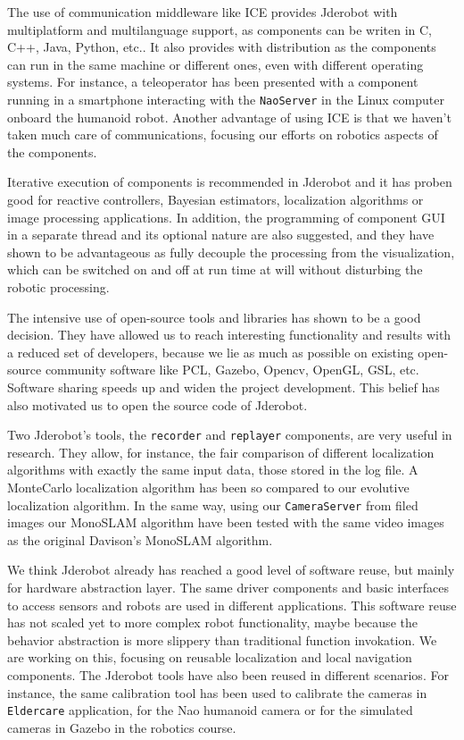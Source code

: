 \documentclass[twocolumn]{svjour3}          %
\begin{document}
The use of communication middleware like ICE provides Jderobot with multiplatform and multilanguage support, as components can be writen in C, C++, Java, Python, etc.. It also provides with distribution as the components can run in the same machine or different ones, even with different operating systems. For instance, a teleoperator has been presented with a component running in a smartphone interacting with the \texttt{NaoServer} in the Linux computer onboard the humanoid robot. Another advantage of using ICE is that we haven't taken much care of communications, focusing our efforts on robotics aspects of the components.

Iterative execution of components is recommended in Jderobot and it has proben good for reactive controllers, Bayesian estimators, localization algorithms or image processing applications. In addition, the programming of component GUI in a separate thread and its optional nature are also suggested, and they have shown to be advantageous as fully decouple the processing from the visualization, which can be switched on and off at run time at will without disturbing the robotic processing.

The intensive use of open-source tools and libraries has shown to be a good decision. They have allowed us to reach interesting functionality and results with a reduced set of developers, because we lie as much as possible on existing open-source community software like PCL, Gazebo, Opencv, OpenGL, GSL, etc. Software sharing speeds up and widen the project development. This belief has also motivated us to open the source code of Jderobot.

Two Jderobot's tools, the \texttt{recorder} and \texttt{replayer} components, are very useful in research. They allow, for instance, the fair comparison of different localization algorithms with exactly the same input data, those stored in the log file. A MonteCarlo localization algorithm has been so compared to our evolutive localization algorithm. In the same way, using our \texttt{CameraServer} from filed images our MonoSLAM algorithm have been tested with the same video images as the original Davison's MonoSLAM algorithm.

We think Jderobot already has reached a good level of software reuse, but mainly for hardware abstraction layer. The same driver components and basic interfaces to access sensors and robots are used in different applications. This software reuse has not scaled yet to more complex robot functionality, maybe because the behavior abstraction is more slippery than traditional function invokation. We are working on this, focusing on reusable localization and local navigation components. The Jderobot tools have also been reused in different scenarios. For instance, the same calibration tool has been used to calibrate the cameras in \texttt{Eldercare} application, for the Nao humanoid camera or for the simulated cameras in Gazebo in the robotics course.
\end{document}

